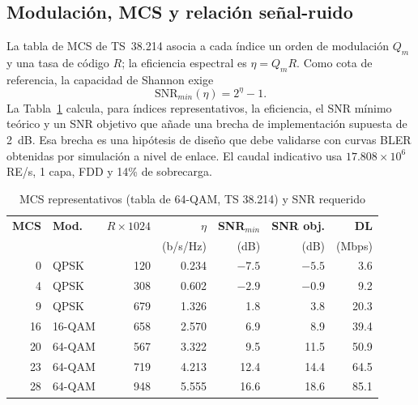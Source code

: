 \documentclass[conference]{IEEEtran}
\begin{document}
\subsection{Modulación, MCS y relación señal-ruido}
La tabla de MCS de TS~38.214 asocia a cada índice un orden de modulación $Q_m$ y una tasa de código $R$; la eficiencia espectral es $\eta=Q_mR$. Como cota de referencia, la capacidad de Shannon exige
\begin{equation}
\mathrm{SNR}_{min}(\eta)=2^{\eta}-1.
\end{equation}
La Tabla~\ref{tab:mcs} calcula, para índices representativos, la eficiencia, el SNR mínimo teórico y un SNR objetivo que añade una brecha de implementación supuesta de 2~dB. Esa brecha es una hipótesis de diseño que debe validarse con curvas BLER obtenidas por simulación a nivel de enlace. El caudal indicativo usa $17.808\times10^{6}$ RE/s, 1 capa, FDD y 14\% de sobrecarga.

\begin{table}[!t]
\caption{MCS representativos (tabla de 64-QAM, TS 38.214) y SNR requerido}
\label{tab:mcs}
\centering
\footnotesize
\renewcommand{\arraystretch}{1.15}
\setlength{\tabcolsep}{3pt}
\begin{tabular}{rlrrrrr}
\toprule
\textbf{MCS} & \textbf{Mod.} & $R\!\times\!1024$ & $\eta$ & \textbf{SNR$_{min}$} & \textbf{SNR obj.} & \textbf{DL} \\
 & & & (b/s/Hz) & (dB) & (dB) & (Mbps) \\
\midrule
0 & QPSK & 120 & 0.234 & $-7.5$ & $-5.5$ & 3.6 \\
4 & QPSK & 308 & 0.602 & $-2.9$ & $-0.9$ & 9.2 \\
9 & QPSK & 679 & 1.326 & 1.8 & 3.8 & 20.3 \\
16 & 16-QAM & 658 & 2.570 & 6.9 & 8.9 & 39.4 \\
20 & 64-QAM & 567 & 3.322 & 9.5 & 11.5 & 50.9 \\
23 & 64-QAM & 719 & 4.213 & 12.4 & 14.4 & 64.5 \\
28 & 64-QAM & 948 & 5.555 & 16.6 & 18.6 & 85.1 \\
\bottomrule
\end{tabular}
\end{table}
\end{document}
